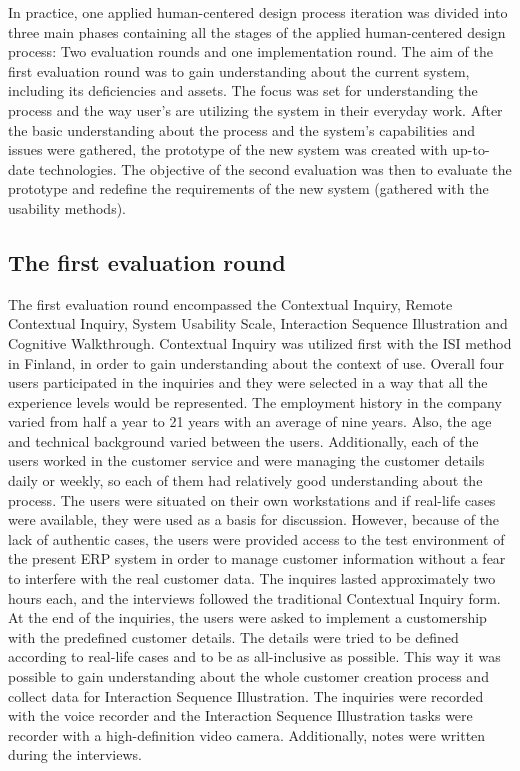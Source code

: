 \documentclass[12pt,a4paper,oneside,pdftex]{report}
\begin{document}
In practice, one applied human-centered design process iteration was divided into three main phases containing all the stages of the applied human-centered design process: Two evaluation rounds and one implementation round. The aim of the first evaluation round was to gain understanding about the current system, including its deficiencies and assets. The focus was set for understanding the process and the way user's are utilizing the system in their everyday work. After the basic understanding about the process and the system's capabilities and issues were gathered, the prototype of the new system was created with up-to-date technologies. The objective of the second evaluation was then to evaluate the prototype and redefine the requirements of the new system (gathered with the usability methods). 

\subsection{The first evaluation round}
\label{sec:firstiteration}

The first evaluation round encompassed the Contextual Inquiry, Remote Contextual Inquiry, System Usability Scale, Interaction Sequence Illustration and Cognitive Walkthrough. Contextual Inquiry was utilized first with the ISI method in Finland, in order to gain understanding about the context of use. Overall four users participated in the inquiries and they were selected in a way that all the experience levels would be represented. The employment history in the company varied from half a year to 21 years with an average of nine years. Also, the age and technical background varied between the users. Additionally, each of the users worked in the customer service and were managing the customer details daily or weekly, so each of them had relatively good understanding about the process. The users were situated on their own workstations and if real-life cases were available, they were used as a basis for discussion. However, because of the lack of authentic cases, the users were provided access to the test environment of the present ERP system in order to manage customer information without a fear to interfere with the real customer data. The inquires lasted approximately two hours each, and the interviews followed the traditional Contextual Inquiry form. At the end of the inquiries, the users were asked to implement a customership with the predefined customer details. The details were tried to be defined according to real-life cases and to be as all-inclusive as possible. This way it was possible to gain understanding about the whole customer creation process and collect data for Interaction Sequence Illustration. The inquiries were recorded with the voice recorder and the Interaction Sequence Illustration tasks were recorder with a high-definition video camera. Additionally, notes were written during the interviews.
\end{document}
